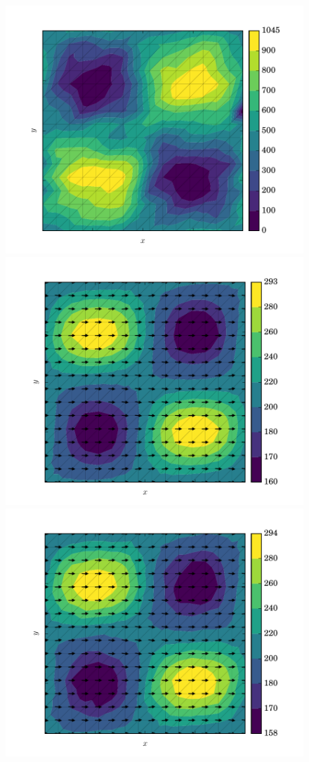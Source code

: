 \begin{figure}
  \centering
    \includegraphics[width=0.9\linewidth]{images/data_assimilation/ISMIP_HOM_C/Tikhonov_100/beta_opt.pdf}
    \includegraphics[width=0.9\linewidth]{images/data_assimilation/ISMIP_HOM_C/Tikhonov_100/U_opt.pdf}
    \includegraphics[width=0.9\linewidth]{images/data_assimilation/ISMIP_HOM_C/Tikhonov_100/U_ob.pdf}

\end{figure}
